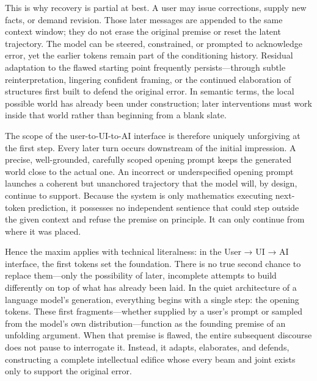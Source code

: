 This is why recovery is partial at best. A user may issue corrections, supply new facts, or demand revision. Those later messages are appended to the same context window; they do not erase the original premise or reset the latent trajectory. The model can be steered, constrained, or prompted to acknowledge error, yet the earlier tokens remain part of the conditioning history. Residual adaptation to the flawed starting point frequently persists—through subtle reinterpretation, lingering confident framing, or the continued elaboration of structures first built to defend the original error. In semantic terms, the local possible world has already been under construction; later interventions must work inside that world rather than beginning from a blank slate.

The scope of the user-to-UI-to-AI interface is therefore uniquely unforgiving at the first step. Every later turn occurs downstream of the initial impression. A precise, well-grounded, carefully scoped opening prompt keeps the generated world close to the actual one. An incorrect or underspecified opening prompt launches a coherent but unanchored trajectory that the model will, by design, continue to support. Because the system is only mathematics executing next-token prediction, it possesses no independent sentience that could step outside the given context and refuse the premise on principle. It can only continue from where it was placed.

Hence the maxim applies with technical literalness: in the User → UI → AI interface, the first tokens set the foundation. There is no true second chance to replace them—only the possibility of later, incomplete attempts to build differently on top of what has already been laid.
In the quiet architecture of a language model’s generation, everything begins with a single step: the opening tokens. These first fragments—whether supplied by a user’s prompt or sampled from the model’s own distribution—function as the founding premise of an unfolding argument. When that premise is flawed, the entire subsequent discourse does not pause to interrogate it. Instead, it adapts, elaborates, and defends, constructing a complete intellectual edifice whose every beam and joint exists only to support the original error.

